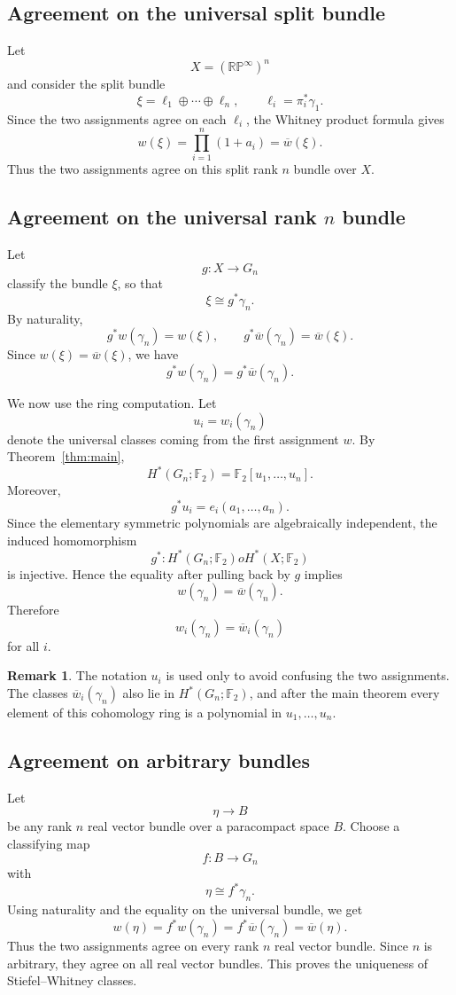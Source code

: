 \documentclass[11pt]{article}
\newcommand{\F}{\mathbb F}
\newcommand{\RP}{\mathbb{RP}}
\theoremstyle{plain}
\theoremstyle{definition}
\newtheorem{remark}[theorem]{Remark}
\numberwithin{equation}{section}
\begin{document}
\subsection{Agreement on the universal split bundle}

Let
\[
  X=(\RP^\infty)^n
\]
and consider the split bundle
\[
  \xi=\ell_1\oplus\cdots\oplus\ell_n,
  \qquad
  \ell_i=\pi_i^*\gamma_1.
\]
Since the two assignments agree on each $\ell_i$, the Whitney product formula gives
\[
  w(\xi)
  =
  \prod_{i=1}^n(1+a_i)
  =
  \overline w(\xi).
\]
Thus the two assignments agree on this split rank $n$ bundle over $X$.

\subsection{Agreement on the universal rank $n$ bundle}

Let
\[
  g:X\to G_n
\]
classify the bundle $\xi$, so that
\[
  \xi\cong g^*\gamma_n.
\]
By naturality,
\[
  g^*w(\gamma_n)=w(\xi),
  \qquad
  g^*\overline w(\gamma_n)=\overline w(\xi).
\]
Since $w(\xi)=\overline w(\xi)$, we have
\[
  g^*w(\gamma_n)=g^*\overline w(\gamma_n).
\]

We now use the ring computation.  Let
\[
  u_i=w_i(\gamma_n)
\]
denote the universal classes coming from the first assignment $w$.  By Theorem~\ref{thm:main},
\[
  H^*(G_n;\F_2)=\F_2[u_1,\ldots,u_n].
\]
Moreover,
\[
  g^*u_i=e_i(a_1,\ldots,a_n).
\]
Since the elementary symmetric polynomials are algebraically independent, the induced homomorphism
\[
  g^*:H^*(G_n;\F_2)	o H^*(X;\F_2)
\]
is injective.  Hence the equality after pulling back by $g$ implies
\[
  w(\gamma_n)=\overline w(\gamma_n).
\]
Therefore
\[
  w_i(\gamma_n)=\overline w_i(\gamma_n)
\]
for all $i$.

\begin{remark}
The notation $u_i$ is used only to avoid confusing the two assignments.  The classes $\overline w_i(\gamma_n)$ also lie in $H^*(G_n;\F_2)$, and after the main theorem every element of this cohomology ring is a polynomial in $u_1,\ldots,u_n$.
\end{remark}

\subsection{Agreement on arbitrary bundles}

Let
\[
  \eta\to B
\]
be any rank $n$ real vector bundle over a paracompact space $B$.  Choose a classifying map
\[
  f:B\to G_n
\]
with
\[
  \eta\cong f^*\gamma_n.
\]
Using naturality and the equality on the universal bundle, we get
\[
  w(\eta)
  =f^*w(\gamma_n)
  =f^*\overline w(\gamma_n)
  =\overline w(\eta).
\]
Thus the two assignments agree on every rank $n$ real vector bundle.  Since $n$ is arbitrary, they agree on all real vector bundles.  This proves the uniqueness of Stiefel--Whitney classes.
\end{document}

